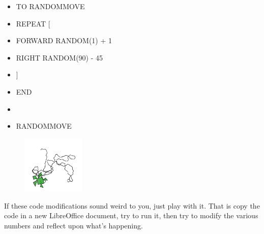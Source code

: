 \begin{scriptsize}
\begin{minipage}{0.50\textwidth}
\begin{itemize}[itemsep=-3pt,parsep=2pt, leftmargin=-0.0mm ]
\item[] TO RANDOMMOVE
\item[] \hspace{8pt} REPEAT [
\item[] \hspace{8pt}\hspace{8pt} FORWARD RANDOM(1) + 1
\item[] \hspace{8pt}\hspace{8pt} RIGHT RANDOM(90) - 45
\item[] \hspace{8pt} ]
\item[] END
\item[]
\item[] RANDOMMOVE
\end{itemize}
\end{minipage}
\end{scriptsize}
\begin{minipage}{0.5\textwidth}
\begin{figure}[H]
\includegraphics[width=3.0cm,trim=4 4 8 4,clip]{./images/caos-della-vita/caos-della-vita-2.png}
\label{dec-2}
\end{figure}
\end{minipage} \hfill

\vskip 1cm

If these code modifications sound weird to you, just play with it. That is copy the code in a new LibreOffice document, try to run it, then try to modify the various numbers and reflect upon what's happening.

